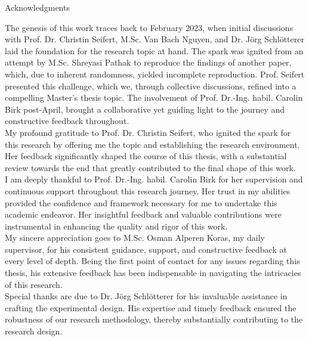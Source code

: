 \thispagestyle{empty}

\vspace*{20mm}

\begin{center}
    { Acknowledgments}
\end{center}

\vspace{10mm}
The genesis of this work traces back to February 2023, when initial discussions with Prof. Dr. Christin Seifert, M.Sc. Van Bach Nguyen, and Dr. Jörg Schlötterer laid the foundation for the research topic at hand. The spark was ignited from an attempt by M.Sc. Shreyasi Pathak to reproduce the findings of another paper, which, due to inherent randomness, yielded incomplete reproduction. Prof. Seifert presented this challenge, which we, through collective discussions, refined into a compelling Master’s thesis topic. The involvement of Prof. Dr.-Ing. habil. Carolin Birk post-April, brought a collaborative yet guiding light to the journey and constructive feedback throughout.\\

My profound gratitude to Prof. Dr. Christin Seifert, who ignited the spark for this research by offering me the topic and establishing the research environment. Her feedback significantly shaped the course of this thesis, with a substantial review towards the end that greatly contributed to the final shape of this work.\\

I am deeply thankful to Prof. Dr.-Ing. habil. Carolin Birk for her supervision and continuous support throughout this research journey. Her trust in my abilities provided the confidence and framework necessary for me to undertake this academic endeavor. Her insightful feedback and valuable contributions were instrumental in enhancing the quality and rigor of this work.\\

My sincere appreciation goes to M.Sc. Osman Alperen Koras, my daily supervisor, for his consistent guidance, support, and constructive feedback at every level of depth. Being the first point of contact for any issues regarding this thesis, his extensive feedback has been indispensable in navigating the intricacies of this research.\\

Special thanks are due to Dr. Jörg Schlötterer for his invaluable assistance in crafting the experimental design. His expertise and timely feedback ensured the robustness of our research methodology, thereby substantially contributing to the research design.\\

